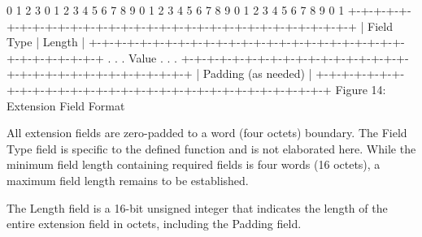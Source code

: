 0 1 2 3
0 1 2 3 4 5 6 7 8 9 0 1 2 3 4 5 6 7 8 9 0 1 2 3 4 5 6 7 8 9 0 1
+-+-+-+-+-+-+-+-+-+-+-+-+-+-+-+-+-+-+-+-+-+-+-+-+-+-+-+-+-+-+-+-+
| Field Type | Length |
+-+-+-+-+-+-+-+-+-+-+-+-+-+-+-+-+-+-+-+-+-+-+-+-+-+-+-+-+-+-+-+-+
. .
. Value .
. .
+-+-+-+-+-+-+-+-+-+-+-+-+-+-+-+-+-+-+-+-+-+-+-+-+-+-+-+-+-+-+-+-+
| Padding (as needed) |
+-+-+-+-+-+-+-+-+-+-+-+-+-+-+-+-+-+-+-+-+-+-+-+-+-+-+-+-+-+-+-+-+
Figure 14: Extension Field Format

All extension fields are zero-padded to a word (four octets)
boundary. The Field Type field is specific to the defined function
and is not elaborated here. While the minimum field length
containing required fields is four words (16 octets), a maximum field
length remains to be established.

The Length field is a 16-bit unsigned integer that indicates the
length of the entire extension field in octets, including the Padding
field.

